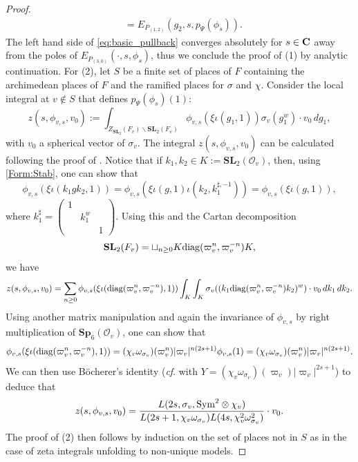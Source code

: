 \documentclass[11pt, reqno]{amsart}
\theoremstyle{plain}
\theoremstyle{definition}
\theoremstyle{remark}
\theoremstyle{plain}
\def\C{{\bf C}}
\def\SL{{\mathbf{SL}}}
\def\Sp{{\mathbf{Sp}}}
\begin{document}
\begin{proof}
\begin{align*}
     &= E_{P_{(1,2)}}(g_2,s,p_\Psi(\phi_s)).
\end{align*}
The left hand side of \eqref{eq:basic_pullback} converges absolutely for $s \in \C$ away from the poles of $E_{P_{(3,0)}}(\cdot, s,\phi_s)$, thus we conclude the proof of (1) by analytic continuation. For (2), let $S$ be a finite set of places of $F$ containing the archimedean places of $F$ and the ramified places for $\sigma$ and $\chi$. Consider the local integral at $v \not \in S$ that defines $p_\Psi(\phi_s)(1)$:
\begin{equation}\label{Local:Zeta:Pullback:Aux} z(s, \phi_{v,s}, v_0):= \int_{Z_{\SL_2}(F_v)\backslash \SL_2(F_v)}  \phi_{v,s}(\xi  \iota( g_1  ,1)) \sigma_v(g_1^w) \cdot v_0\, d g_1, \end{equation}
with $v_0$ a spherical vector of $\sigma_v$. The integral $z(s, \phi_{v,s}, v_0)$ can be calculated following the proof of \cite[Proposition 4.1]{PitaleSchmidt}. Notice that if $k_1,k_2 \in K := \SL_2(\mathcal{O}_v)$, then, using \eqref{Form:Stab}, one can show that \[\phi_{v,s}( \xi \iota (k_1 g k_2, 1)) =  \phi_{v,s}( \xi \iota (g, 1)  \iota ( k_2, k_1^{\sharp,-1})) =   \phi_{v,s}( \xi \iota (g, 1)), \]
where $k_1^\sharp = \left(\begin{smallmatrix} 1 &  &  \\ & k_1^w & \\  & & 1 \end{smallmatrix} \right)$. Using this and the Cartan decomposition \[ \SL_2(F_v) = \sqcup_{n \geq 0} K{\rm diag}(\varpi_v^{n},\varpi_v^{-n})K, \]
we have 
\begin{align*}
    z(s, \phi_{v,s}, v_0) = \sum_{n \geq 0}\phi_{v,s}(\xi  \iota( {\rm diag}(\varpi_v^{n},\varpi_v^{-n})  ,1)) \int_{K} \int_{K} \sigma_v((k_1{\rm diag}(\varpi_v^{n},\varpi_v^{-n})k_2)^w) \cdot v_0\, d k_1\, d k_2.
\end{align*}
Using another matrix manipulation and again the invariance of $\phi_{v,s}$ by right multiplication of $\Sp_6(\mathcal{O}_v)$, one can show that \[\phi_{v,s}(\xi  \iota( {\rm diag}(\varpi_v^{n},\varpi_v^{-n})  ,1)) = (\chi_v \omega_{\sigma_v})(\varpi_v^{n})|\varpi_v|^{n(2s+1)}\phi_{v,s}(1) =(\chi_v \omega_{\sigma_v})(\varpi_v^{n})|\varpi_v|^{n(2s+1)}.\]
We can then use B\"ocherer's identity (\textit{cf}. \cite[(23)]{PitaleSchmidt} with $Y= (\chi_v \omega_{\sigma_v})(\varpi_v)|\varpi_v|^{2s+1}$) to deduce that \begin{equation}\label{Bocherer:Identity}z(s, \phi_{v,s}, v_0) = \frac{L(2s,\sigma_v,{\rm Sym}^2 \otimes \chi_v)}{L(2s+1, \chi_v\omega_{\sigma_v})L(4s, \chi_v^2\omega_{\sigma_v}^2) } \cdot v_0. \end{equation}
The proof of (2) then follows by induction on the set of places not in $S$ as in the case of zeta integrals
unfolding to non-unique models.
\end{proof}
\end{document}
